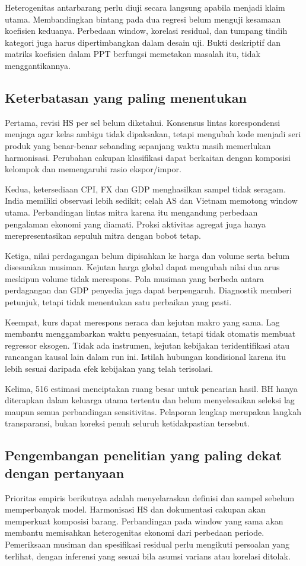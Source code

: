 Heterogenitas antarbarang perlu diuji secara langsung apabila menjadi klaim utama. Membandingkan bintang pada dua regresi belum menguji kesamaan koefisien keduanya. Perbedaan window, korelasi residual, dan tumpang tindih kategori juga harus dipertimbangkan dalam desain uji. Bukti deskriptif dan matriks koefisien dalam PPT berfungsi memetakan masalah itu, tidak menggantikannya.

\subsection{Keterbatasan yang paling menentukan}
Pertama, revisi HS per sel belum diketahui. Konsensus lintas korespondensi menjaga agar kelas ambigu tidak dipaksakan, tetapi mengubah kode menjadi seri produk yang benar-benar sebanding sepanjang waktu masih memerlukan harmonisasi. Perubahan cakupan klasifikasi dapat berkaitan dengan komposisi kelompok dan memengaruhi rasio ekspor/impor.

Kedua, ketersediaan CPI, FX dan GDP menghasilkan sampel tidak seragam. India memiliki observasi lebih sedikit; celah AS dan Vietnam memotong window utama. Perbandingan lintas mitra karena itu mengandung perbedaan pengalaman ekonomi yang diamati. Proksi aktivitas agregat juga hanya merepresentasikan sepuluh mitra dengan bobot tetap.

Ketiga, nilai perdagangan belum dipisahkan ke harga dan volume serta belum disesuaikan musiman. Kejutan harga global dapat mengubah nilai dua arus meskipun volume tidak merespons. Pola musiman yang berbeda antara perdagangan dan GDP penyedia juga dapat berpengaruh. Diagnostik memberi petunjuk, tetapi tidak menentukan satu perbaikan yang pasti.

Keempat, kurs dapat merespons neraca dan kejutan makro yang sama. Lag membantu menggambarkan waktu penyesuaian, tetapi tidak otomatis membuat regressor eksogen. Tidak ada instrumen, kejutan kebijakan teridentifikasi atau rancangan kausal lain dalam run ini. Istilah hubungan kondisional karena itu lebih sesuai daripada efek kebijakan yang telah terisolasi.

Kelima, 516 estimasi menciptakan ruang besar untuk pencarian hasil. BH hanya diterapkan dalam keluarga utama tertentu dan belum menyelesaikan seleksi lag maupun semua perbandingan sensitivitas. Pelaporan lengkap merupakan langkah transparansi, bukan koreksi penuh seluruh ketidakpastian tersebut.

\subsection{Pengembangan penelitian yang paling dekat dengan pertanyaan}
Prioritas empiris berikutnya adalah menyelaraskan definisi dan sampel sebelum memperbanyak model. Harmonisasi HS dan dokumentasi cakupan akan memperkuat komposisi barang. Perbandingan pada window yang sama akan membantu memisahkan heterogenitas ekonomi dari perbedaan periode. Pemeriksaan musiman dan spesifikasi residual perlu mengikuti persoalan yang terlihat, dengan inferensi yang sesuai bila asumsi varians atau korelasi ditolak.

